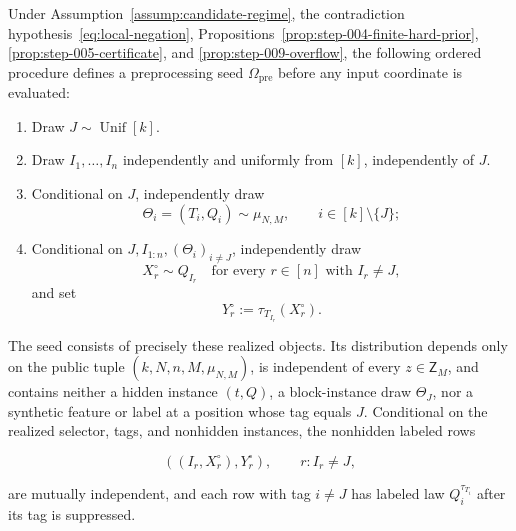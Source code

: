 \begin{lemma}\label{lem:step-010-public-preprocessing}
Under Assumption~\ref{assump:candidate-regime}, the contradiction hypothesis~\eqref{eq:local-negation},
Propositions~\ref{prop:step-004-finite-hard-prior},
\ref{prop:step-005-certificate}, and
\ref{prop:step-009-overflow}, the following ordered procedure defines a
preprocessing seed \(\Omega_{\mathrm{pre}}\) before any input coordinate is
evaluated:

\begin{enumerate}
\item Draw \(J\sim\operatorname{Unif}[k]\).
\item Draw \(I_1,\ldots,I_n\) independently and uniformly from \([k]\),
independently of \(J\).
\item Conditional on \(J\), independently draw
   \[
     \Theta_i=(T_i,Q_i)\sim\mu_{N,M},
     \qquad i\in[k]\setminus\{J\};
   \]
\item Conditional on \(J,I_{1:n},(\Theta_i)_{i\ne J}\), independently draw
   \[
     X_r^\circ\sim Q_{I_r}
     \quad\text{for every }r\in[n]\text{ with }I_r\ne J,
   \]
   and set
   \[
     Y_r^\circ:=\tau_{T_{I_r}}(X_r^\circ).
   \]
\end{enumerate}

The seed consists of precisely these realized objects. Its distribution
depends only on the public tuple
\((k,N,n,M,\mu_{N,M})\), is independent of every
\(z\in\mathsf Z_M\), and contains neither a hidden instance
\((t,Q)\), a block-instance draw \(\Theta_J\), nor a synthetic feature or
label at a position whose tag equals \(J\). Conditional on the realized
selector, tags, and nonhidden instances, the nonhidden labeled
rows

\[
  \left((I_r,X_r^\circ),Y_r^\circ\right),
  \qquad r:I_r\ne J,
\tag{6}
\]

are mutually independent, and each row with tag \(i\ne J\) has labeled law
\(Q_i^{\tau_{T_i}}\) after its tag is suppressed.
\end{lemma}

